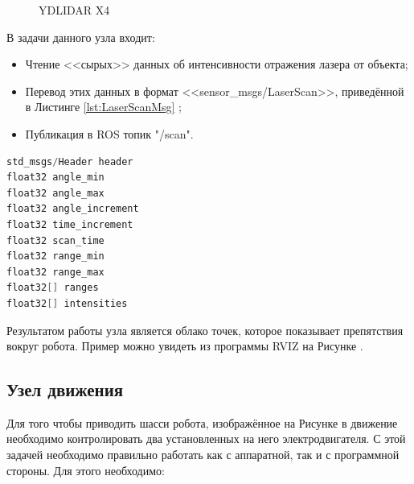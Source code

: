 \documentclass[12pt,a4paper]{scrartcl}
\begin{document}
				\begin{figure}[h]
					\caption{YDLIDAR X4}
					\label{fig:ydlidarx4}
				\end{figure}
				
				В задачи данного узла входит:
				\begin{itemize}
					\item Чтение <<сырых>> данных об интенсивности отражения лазера от объекта;
					\item Перевод этих данных в формат <<sensor\_msgs/LaserScan>>, приведённой в Листинге \ref{lst:LaserScanMsg} ;
					\item Публикация в ROS топик "/scan".
				\end{itemize}
				
				\begin{lstlisting}[language=C,caption={Формат сообщения sensor\_msgs/LaserScan},label={lst:LaserScanMsg}]
std_msgs/Header header
float32 angle_min
float32 angle_max
float32 angle_increment
float32 time_increment
float32 scan_time
float32 range_min
float32 range_max
float32[] ranges
float32[] intensities
				\end{lstlisting}	
				
				Результатом работы узла является облако точек, которое показывает препятствия вокруг робота\cite{bib:lidarDescription}. Пример можно увидеть из программы RVIZ на Рисунке .
				
			\subsection{Узел движения} \label{sec:Movement}
				Для того чтобы приводить шасси робота, изображённое на Рисунке  в движение необходимо контролировать два установленных на него электродвигателя. С этой задачей необходимо правильно работать как с аппаратной, так и с программной стороны. Для этого необходимо:
				
\end{document}
